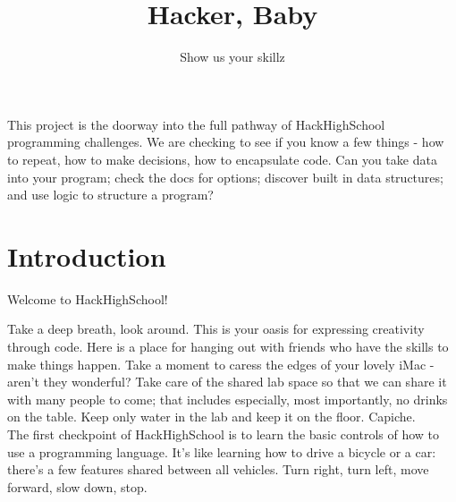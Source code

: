 \documentclass{42-en}
\begin{document}
\title{Hacker, Baby}
\subtitle{Show us your skillz}


\summary
{
This project is the doorway into the full pathway of HackHighSchool programming challenges. We are checking to see if you know a few things - how to repeat, how to make decisions, how to encapsulate code. Can you take data into your program; check the docs for options; discover built in data structures; and use logic to structure a program?
}

\maketitle

\tableofcontents





\chapter{Introduction}

Welcome to HackHighSchool!

Take a deep breath, look around. This is your oasis for expressing creativity through code. Here is a place for hanging out with 
friends who have the skills to make things happen. Take a moment to caress the edges of your lovely iMac - aren't they wonderful? Take care of the shared lab space so that we can share it with many people to come;
that includes especially, most importantly, no drinks on the table. Keep only water in the lab and keep it on the
floor. Capiche.\\

The first checkpoint of HackHighSchool is to learn the basic controls of how to use a programming language. It's
like learning how to drive a bicycle or a car: there's a few features shared between all vehicles. Turn right,
turn left, move forward, slow down, stop.\\
\end{document}
